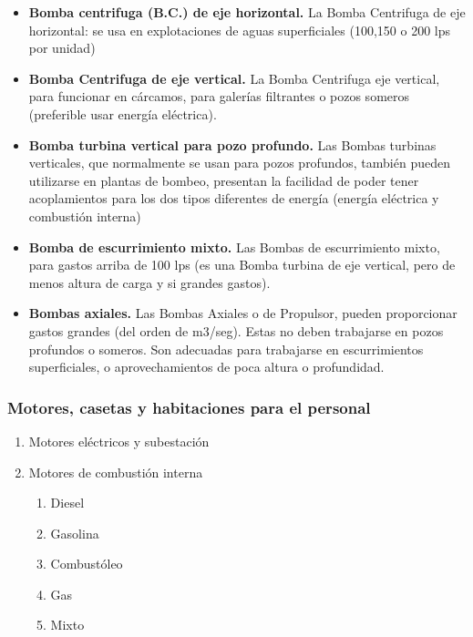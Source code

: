 \begin{itemize}
	\item \textbf{Bomba centrifuga (B.C.) de eje horizontal.}
	      La Bomba Centrifuga de eje horizontal: se usa en explotaciones de aguas
	      superficiales (100,150 o 200 lps por unidad)

	\item \textbf{Bomba Centrifuga de eje vertical.}
	      La Bomba Centrifuga eje vertical, para funcionar en cárcamos, para galerías
	      filtrantes o pozos someros (preferible usar energía eléctrica).

	\item \textbf{Bomba turbina vertical para pozo profundo.}
	      Las Bombas turbinas verticales, que normalmente se usan para pozos
	      profundos, también pueden utilizarse en plantas de bombeo, presentan la facilidad de
	      poder tener acoplamientos para los dos tipos diferentes de energía (energía eléctrica y
	      combustión interna)

	\item \textbf{Bomba de escurrimiento mixto.}
	      Las Bombas de escurrimiento mixto, para gastos arriba de 100 lps (es una
	      Bomba turbina de eje vertical, pero de menos altura de carga y si grandes gastos).

	\item \textbf{Bombas axiales.}
	      Las Bombas Axiales o de Propulsor, pueden proporcionar gastos grandes (del
	      orden de m3/seg). Estas no deben trabajarse en pozos profundos o someros. Son
	      adecuadas para trabajarse en escurrimientos superficiales, o aprovechamientos de
	      poca altura o profundidad.
\end{itemize}


\subsubsection{Motores, casetas y habitaciones para el personal}

\begin{enumerate}
	\item Motores eléctricos y subestación
	\item Motores de combustión interna
	      \begin{enumerate}
		      \item Diesel
		      \item Gasolina
		      \item Combustóleo
		      \item Gas
		      \item Mixto
	      \end{enumerate}
\end{enumerate}

